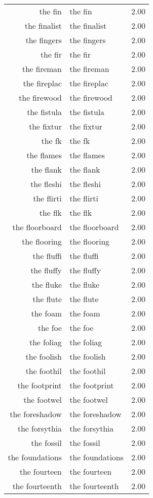 \begin{table}[ht]
\begin{tabular}{rlr}
  the fin & the fin & 2.00 \\ 
  the finalist & the finalist & 2.00 \\ 
  the fingers & the fingers & 2.00 \\ 
  the fir & the fir & 2.00 \\ 
  the fireman & the fireman & 2.00 \\ 
  the fireplac & the fireplac & 2.00 \\ 
  the firewood & the firewood & 2.00 \\ 
  the fistula & the fistula & 2.00 \\ 
  the fixtur & the fixtur & 2.00 \\ 
  the fk & the fk & 2.00 \\ 
  the flames & the flames & 2.00 \\ 
  the flank & the flank & 2.00 \\ 
  the fleshi & the fleshi & 2.00 \\ 
  the flirti & the flirti & 2.00 \\ 
  the flk & the flk & 2.00 \\ 
  the floorboard & the floorboard & 2.00 \\ 
  the flooring & the flooring & 2.00 \\ 
  the fluffi & the fluffi & 2.00 \\ 
  the fluffy & the fluffy & 2.00 \\ 
  the fluke & the fluke & 2.00 \\ 
  the flute & the flute & 2.00 \\ 
  the foam & the foam & 2.00 \\ 
  the foe & the foe & 2.00 \\ 
  the foliag & the foliag & 2.00 \\ 
  the foolish & the foolish & 2.00 \\ 
  the foothil & the foothil & 2.00 \\ 
  the footprint & the footprint & 2.00 \\ 
  the footwel & the footwel & 2.00 \\ 
  the foreshadow & the foreshadow & 2.00 \\ 
  the forsythia & the forsythia & 2.00 \\ 
  the fossil & the fossil & 2.00 \\ 
  the foundations & the foundations & 2.00 \\ 
  the fourteen & the fourteen & 2.00 \\ 
  the fourteenth & the fourteenth & 2.00 \\ 

\end{tabular}
\end{table}
